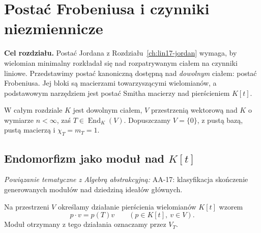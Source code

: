 \chapter{Postać Frobeniusa i czynniki niezmiennicze}
\label{ch:lin19-frobenius}

\providecommand{\atlasref}[2]{#2}


\noindent\textbf{Cel rozdziału.}
Postać Jordana z Rozdziału~\ref{ch:lin17-jordan}
wymaga, by wielomian minimalny rozkładał się
nad rozpatrywanym ciałem na czynniki liniowe.
Przedstawimy postać kanoniczną dostępną nad
\emph{dowolnym} ciałem: postać Frobeniusa.
Jej bloki są macierzami towarzyszącymi wielomianów,
a podstawowym narzędziem jest postać Smitha
macierzy nad pierścieniem \(K[t]\).

W całym rozdziale \(K\) jest dowolnym ciałem,
\(V\) przestrzenią wektorową nad \(K\)
o wymiarze \(n<\infty\), zaś
\(T\in\operatorname{End}_K(V)\).
Dopuszczamy \(V=\{0\}\), z pustą bazą,
pustą macierzą i \(\chi_T=m_T=1\).

\section{Endomorfizm jako moduł nad \texorpdfstring{\(K[t]\)}{K[t]}}
\label{sec:lin19-module}

\noindent\emph{Powiązanie tematyczne z Algebrą abstrakcyjną:} \atlasref{AA-17::aa:tw:pid-structure}{AA-17: klasyfikacja skończenie generowanych modułów nad dziedziną ideałów głównych}.


\begin{definicja}
\label{def:lin19-module}
Na przestrzeni \(V\) określamy działanie
pierścienia wielomianów \(K[t]\) wzorem
\[
 p\cdot v=p(T)v \qquad (p\in K[t],\ v\in V).
\]
Moduł otrzymany z tego działania
oznaczamy przez \(V_T\).
\end{definicja}

